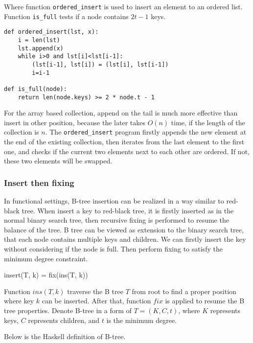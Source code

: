\documentclass{article}
\begin{document}
Where function \texttt{ordered\_insert} is used to insert an element
to an ordered list. Function \texttt{is\_full} tests if a node contains
$2t-1$ keys.

\begin{lstlisting}
def ordered_insert(lst, x):
    i = len(lst)
    lst.append(x)
    while i>0 and lst[i]<lst[i-1]:
        (lst[i-1], lst[i]) = (lst[i], lst[i-1])
        i=i-1

def is_full(node):
    return len(node.keys) >= 2 * node.t - 1
\end{lstlisting}

For the array based collection, append on the tail is much more effective than
insert in other position, because the later takes $O(n)$ time, if the length
of the collection is $n$. The \texttt{ordered\_insert} program firstly appends
 the new element at the end of the existing collection, then iterates from the
last element to the first one, and checks if the current two elements next to each other
are ordered. If not, these two elements will be swapped.


\subsubsection{Insert then fixing}

In functional settings, B-tree insertion can be realized in a way similar to
red-black tree. When insert a key to red-black tree, it is firstly inserted
as in the normal binary search tree, then recursive fixing is performed to
resume the balance of the tree. B tree can be viewed as extension to the
binary search tree, that each node contains multiple keys and children.
We can firstly insert the key without considering if the node is full.
Then perform fixing to satisfy the minimum degree constraint.

\be
insert(T, k) = fix(ins(T, k))
\ee

Function $ins(T, k)$ traverse the B tree $T$ from root to find a proper
position where key $k$ can be inserted. After that, function $fix$ is
applied to resume the B tree properties. Denote B-tree in a form of
$T = (K, C, t)$, where $K$ represents keys, $C$ represents children,
and $t$ is the minimum degree.

Below is the Haskell definition of B-tree.
\end{document}
